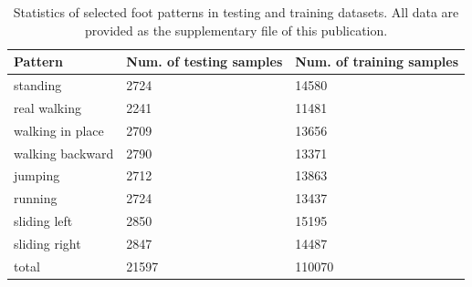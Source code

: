 \documentclass[review]{vgtc}                 %
\begin{document}
\begin{table}[!htp]
	\def\arraystretch{1.25}
	\centering	
	\begin{tabular}{C{2.8cm}C{2.3cm}C{2.3cm}}
		\hline
		Pattern	& Num. of \newline testing samples & Num. of \newline training samples \\
		\hline\hline
		standing          & 2724           & 14580           \\
		real walking          &    2241       & 11481    \\		
		walking in place  & 2709           & 13656          \\
		walking backward & 2790           & 13371           \\
		jumping           & 2712           & 13863           \\
		running           & 2724           & 13437          \\
		sliding left     & 2850           & 15195           \\
		sliding right    & 2847           & 14487           \\
		total             & 21597          & 110070          \\
		\hline
	\end{tabular}
	\caption{\label{tab:action}Statistics of selected foot patterns in testing and training datasets. All data are provided as the supplementary file of this publication.}
\end{table}
\end{document}
